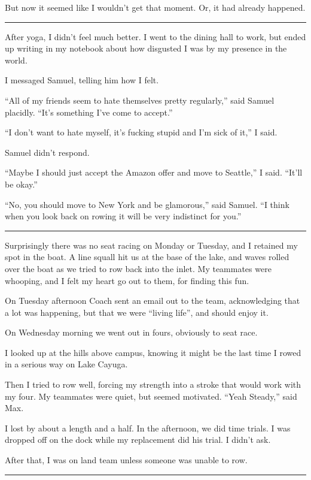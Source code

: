 But now it seemed like I wouldn't get that moment.  Or, it had already happened.

\plainfancybreak{12pt}{2}{* * *}

After yoga, I didn't feel much better.  I went to the dining hall to work, but
ended up writing in my notebook about how disgusted I was by my presence in the
world.

I messaged Samuel, telling him how I felt.

``All of my friends seem to hate themselves pretty regularly,'' said Samuel
placidly.  ``It's something I've come to accept.''

``I don't want to hate myself, it's fucking stupid and I'm sick of it,'' I said.  

Samuel didn't respond.

``Maybe I should just accept the Amazon offer and move to Seattle,'' I said.
``It'll be okay.''

``No, you should move to New York and be glamorous,'' said Samuel.  ``I think
when you look back on rowing it will be very indistinct for you.'' 

\plainfancybreak{12pt}{2}{* * *}

Surprisingly there was no seat racing on Monday or Tuesday, and I retained my
spot in the boat.  A line squall hit us at the base of the lake, and waves
rolled over the boat as we tried to row back into the inlet.  My teammates were
whooping, and I felt my heart go out to them, for finding this fun.

On Tuesday afternoon Coach sent an email out to the team, acknowledging that a
lot was happening, but that we were ``living life'', and should enjoy it.

On Wednesday morning we went out in fours, obviously to seat race.

I looked up at the hills above campus, knowing it might be the last time I rowed
in a serious way on Lake Cayuga.  

Then I tried to row well, forcing my strength into a stroke that would work with
my four.  My teammates were quiet, but seemed motivated. ``Yeah Steady,'' said
Max.

I lost by about a length and a half.  In the afternoon, we did time trials.  I
was dropped off on the dock while my replacement did his trial.  I didn't ask.

After that, I was on land team unless someone was unable to row.

\plainfancybreak{12pt}{2}{* * *}

